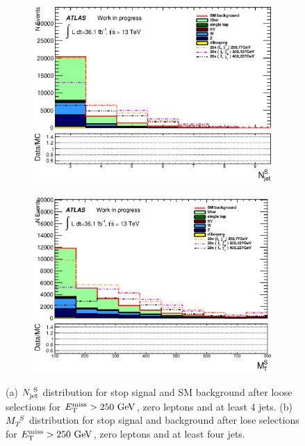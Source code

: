 \begin{figure}[htb]
  \begin{center}
    \begin{subfigure}[a]{0.45\textwidth}
        \includegraphics[width=\textwidth]{figures/plotSR/SR_ND1_NjV_0SR.eps}%
        \caption{ }
    \end{subfigure}
    \begin{subfigure}[b]{0.45\textwidth}
        \includegraphics[width=\textwidth]{figures/plotSR/SR_ND1_MS_0SR.eps}%
                \caption{ }
    \end{subfigure}
\caption{ (a) $N_{\mathrm{jet}}^{~\mathrm{S}}$ distribution for stop signal and SM background after loose selections for $\met>250 \gev$, zero leptons and at least 4 jets.  (b) $M_{T}^{~S}$ distribution for stop signal and background after lose selections for $\met>250 \gev$, zero leptons and at least four jets.  }
\end{center}
\label{fig:gluino_meff} 
\end{figure}

